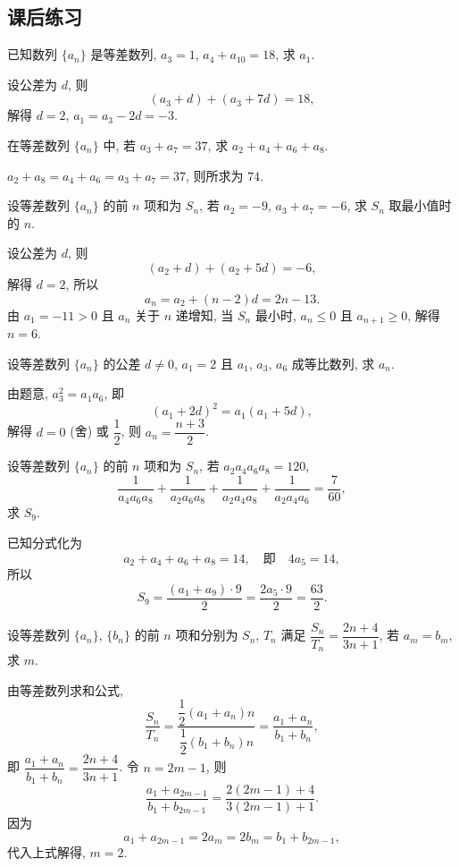\subsection{课后练习}
\begin{exercise}
    已知数列 $\{a_n\}$ 是等差数列, $a_3=1$, $a_4+a_{10}=18$, 求 $a_1$.
\end{exercise}
\beginsolution
    设公差为 $d$, 则
    \[(a_3+d)+ (a_3+7d)= 18,\]
    解得 $d=2$, $a_1= a_3- 2d= -3$.
\endsolution

\begin{exercise}
    在等差数列 $\{a_n\}$ 中, 若 $a_3 +a_7 =37$, 求 $a_2 +a_4 +a_6 +a_8$.
\end{exercise}
\beginsolution
    $a_2 +a_8= a_4 +a_6= a_3 +a_7 =37$, 则所求为 $74$.
\endsolution

\begin{exercise}
    设等差数列 $\{a_n\}$ 的前 $n$ 项和为 $S_n$, 若 $a_2=-9$, $a_3+a_7=-6$, 求 $S_n$ 取最小值时的 $n$.
\end{exercise}
\beginsolution
    设公差为 $d$, 则
    \[(a_2+d)+ (a_2+5d)= -6,\]
    解得 $d=2$, 所以
    \[a_n= a_2+(n-2)d= 2n-13.\]
    由 $a_1= -11>0$ 且 $a_n$ 关于 $n$ 递增知, 当 $S_n$ 最小时, $a_n\leqslant 0$ 且 $a_{n+1}\geqslant 0$, 解得 $n=6$.
\endsolution

\begin{exercise}
    设等差数列 $\{a_n\}$ 的公差 $d\neq 0$, $a_1=2$ 且 $a_1$, $a_3$, $a_6$ 成等比数列, 求 $a_n$.
\end{exercise}
\beginsolution
    由题意, $a_3^2= a_1a_6$, 即
    \[(a_1+2d)^2= a_1(a_1+5d),\]
    解得 $d=0$ (舍) 或 $\dfrac12$, 则 $a_n= \dfrac{n+3}2$.
\endsolution

\begin{exercise}
    设等差数列 $\{a_n\}$ 的前 $n$ 项和为 $S_n$, 若 $a_2 a_4 a_6 a_8=120$,
    \[\dfrac1{a_4 a_6 a_8}+ \dfrac1{a_2 a_6 a_8}+ 
        \dfrac1{a_2 a_4 a_8}+ \dfrac1{a_2 a_4 a_6}
        =\dfrac7{60},\]
    求 $S_9$.
\end{exercise}
\beginsolution
    已知分式化为 
    \[a_2+a_4+a_6+a_8= 14,\quad\text{即}\quad
        4a_5= 14,\]
    所以 
    \[S_9= \frac{(a_1+a_9)\cdot 9}2
        = \frac{2a_5\cdot 9}2
        = \frac{63}{2}.\]
\endsolution

\begin{exercise}
    设等差数列 $\{a_n\}$, $\{b_n\}$ 的前 $n$ 项和分别为 $S_n$, $T_n$ 满足 $\dfrac{S_n}{T_n}= \dfrac{2n+4}{3n+1}$, 若 $a_m=b_m$, 求 $m$.
\end{exercise}
\beginsolution
    由等差数列求和公式,
    \[\frac{S_n}{T_n}
        = \frac{\dfrac12(a_1+a_n)n}{\dfrac12(b_1+b_n)n}
        = \frac{a_1+a_n}{b_1+b_n},\]
    即 $\dfrac{a_1+a_n}{b_1+b_n}= \dfrac{2n+4}{3n+1}$. 令 $n= 2m-1$, 则
    \[\dfrac{a_1+a_{2m-1}}{b_1+b_{2m-1}}
        = \dfrac{2(2m-1)+4}{3(2m-1)+1}.\]
    因为 
    \[a_1+a_{2m-1}= 2a_m= 2b_m= b_1+b_{2m-1},\]
    代入上式解得, $m=2$.
\endsolution

